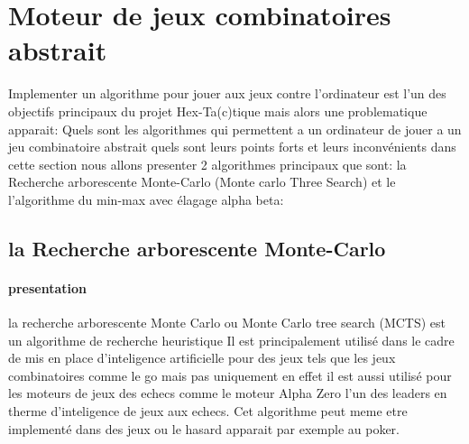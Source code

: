 \section{Moteur de jeux combinatoires abstrait}





Implementer un algorithme pour jouer aux jeux contre l'ordinateur est l'un des objectifs principaux du projet
Hex-Ta(c)tique mais alors une problematique apparait: Quels sont les algorithmes qui permettent a un ordinateur
de jouer a un jeu combinatoire abstrait quels sont leurs points forts et leurs inconvénients dans cette section nous allons
presenter 2 algorithmes principaux que sont: la Recherche arborescente Monte-Carlo (Monte carlo Three Search) et le
l'algorithme du min-max avec élagage alpha beta:

\subsection {la Recherche arborescente Monte-Carlo}

\paragraph {presentation}
la recherche arborescente Monte Carlo ou Monte Carlo tree search (MCTS) est un algorithme de recherche heuristique
Il est principalement utilisé dans le cadre de mis en place d'inteligence artificielle pour des jeux tels que les jeux combinatoires
comme le go mais pas uniquement en effet il est aussi utilisé pour les moteurs de jeux des echecs comme le moteur Alpha Zero 
l'un des leaders en therme d'inteligence de jeux aux echecs. Cet algorithme peut meme etre implementé dans des jeux ou le hasard 
apparait par exemple au poker.

